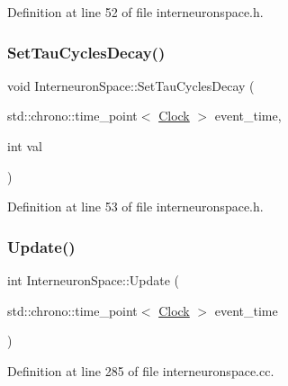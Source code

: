Definition at line 52 of file interneuronspace.\+h.

\mbox{\label{class_interneuron_space_a7f44a965e377ecdc5c387af2b5d30d69}} 
\subsubsection{\texorpdfstring{Set\+Tau\+Cycles\+Decay()}{SetTauCyclesDecay()}}
{\footnotesize\ttfamily void Interneuron\+Space\+::\+Set\+Tau\+Cycles\+Decay (\begin{DoxyParamCaption}\item[{std\+::chrono\+::time\+\_\+point$<$ \hyperlink{universe_8h_a0ef8d951d1ca5ab3cfaf7ab4c7a6fd80}{Clock} $>$}]{event\+\_\+time,  }\item[{int}]{val }\end{DoxyParamCaption})\hspace{0.3cm}{\ttfamily [inline]}}



Definition at line 53 of file interneuronspace.\+h.

\mbox{\label{class_interneuron_space_a72ce2431e1348dd2558fa9b8f864d306}} 
\subsubsection{\texorpdfstring{Update()}{Update()}}
{\footnotesize\ttfamily int Interneuron\+Space\+::\+Update (\begin{DoxyParamCaption}\item[{std\+::chrono\+::time\+\_\+point$<$ \hyperlink{universe_8h_a0ef8d951d1ca5ab3cfaf7ab4c7a6fd80}{Clock} $>$}]{event\+\_\+time }\end{DoxyParamCaption})}



Definition at line 285 of file interneuronspace.\+cc.

